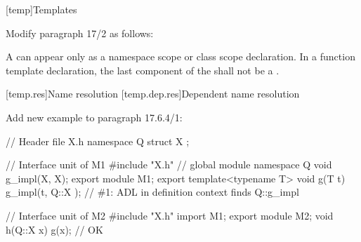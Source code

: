 \setcounter{chapter}{16}
[temp]{Templates}%

\noindent
Modify paragraph 17/2 as follows:
\begin{std.txt}
  \resetalinea[1]
  \alinea
  A  can appear only as a 
  namespace scope or class scope declaration.
  In a function template declaration, the last component of the 
   shall not be a . 
\end{std.txt}






\setcounter{section}{5}
[temp.res]{Name resolution}
\setcounter{subsection}{3}
[temp.dep.res]{Dependent name resolution}

Add new example to paragraph 17.6.4/1:
\begin{std.txt}
  \begin{addedblock}
  \enterexample
  \begin{codeblock}
    // Header file X.h
    namespace Q { 
       struct X { };
    }

    // Interface unit of M1
    #include "X.h"       // global module
    namespace Q {
       void g_impl(X, X);
    }
    export module M1;
    export template<typename T>
    void g(T t) {
       g_impl(t, Q::X{ });  // \#1: ADL in definition context finds Q::g_impl
    }

    // Interface unit of M2
    #include "X.h"
    import M1;
    export module M2;
    void h(Q::X x) {
       g(x);               // OK
    }
  \end{codeblock}
  \exitexample
\end{addedblock}
\end{std.txt}


